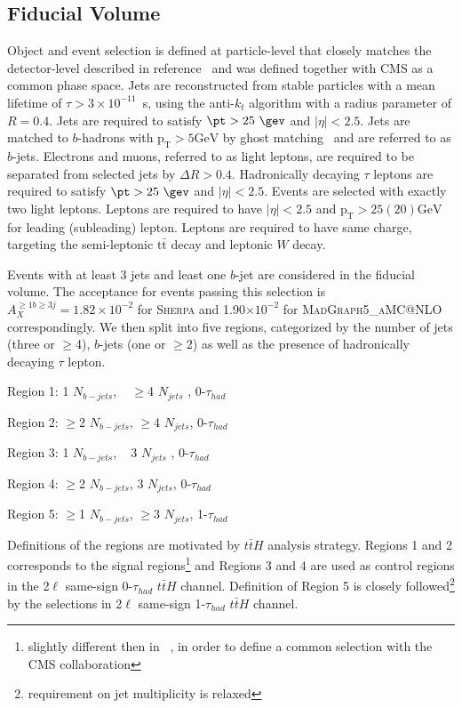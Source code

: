 
\subsection{Fiducial Volume}
Object and event selection is defined at particle-level that closely matches the detector-level described in reference~\cite{ATLAS-CONF-2019-045} and was defined together with CMS as a common phase space. 
Jets are reconstructed from stable particles with a mean lifetime of $\tau > 3\times 10^{-11}$~s, using the anti-$k_t$ algorithm with a radius parameter of $R=0.4$.
Jets are required to satisfy $\pt > 25~\gev$ and $|\eta| < 2.5$.
Jets are matched to $b$-hadrons with $\mathrm{p_{T}>5 GeV}$ by ghost matching~\cite{Cacciari:2008gn} and are referred to as $b$-jets. 
Electrons and muons, referred to as light leptons, are required to be separated from selected jets by $\Delta R>0.4$. 
Hadronically decaying $\tau$ leptons are required to satisfy $\pt > 25~\gev$ and $|\eta| < 2.5$.
Events are selected with exactly two light leptons.
Leptons are required to have $|\eta|< 2.5$ and $\mathrm{p_{T}>25(20) GeV}$ for leading (subleading) lepton. 
Leptons are required to have same charge, targeting the semi-leptonic $\mathrm{t\bar{t}}$ decay and leptonic $W$ decay.

Events with at least 3 jets and least one $b$-jet are considered in the fiducial volume. 
The acceptance for events passing this selection is $A_X^{\geq1b\geq3j}=1.82\times10^{-2}$ for \textsc{Sherpa} and 1.90$\times10^{-2}$ for \textsc{MadGraph5\_aMC@NLO} correspondingly.
We then split into five regions, categorized by the number of jets (three or  $\geq$4), $b$-jets (one or $\geq$2) as well as the presence of hadronically decaying $\tau$ lepton. 
				\begin{description}
				\item Region 1: 1 $N_{b-jets}$, ~ $\geq$4 $N_{jets}$ , 0-$\tau_{had}$
				\item Region 2: $\geq$2 $N_{b-jets}$,   $\geq$4 $N_{jets}$, 0-$\tau_{had}$
				\item Region 3: 1 $N_{b-jets}$, ~  3 $N_{jets}$ , 0-$\tau_{had}$
				\item Region 4: $\geq$2 $N_{b-jets}$, 3 $N_{jets}$, 0-$\tau_{had}$
				\item Region 5: $\geq$1 $N_{b-jets}$, $\geq$3 $N_{jets}$, 1-$\tau_{had}$
				\end{description}
Definitions of the regions are motivated by $t\bar{t}H$ analysis strategy.
Regions 1 and 2 corresponds to the signal regions\footnote{slightly different then in ~\cite{ATLAS-CONF-2019-045}, in order to define a common selection with the CMS collaboration} and Regions 3 and 4 are used as control regions in the 2$\ell$ same-sign  0-$\tau_{had}$ $t\bar{t}H$ channel.
Definition of Region 5 is closely followed\footnote{requirement on jet multiplicity is relaxed} by the selections in 2$\ell$ same-sign 1-$\tau_{had}$ $t\bar{t}H$ channel.

